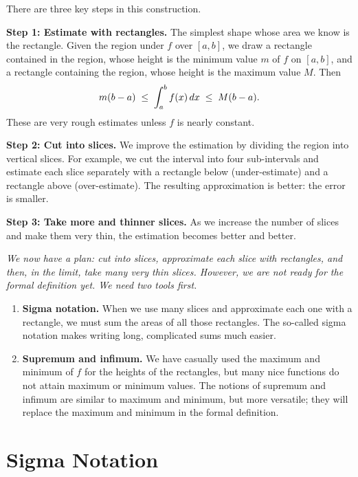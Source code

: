 There are three key steps in this construction.

\textbf{Step 1: Estimate with rectangles.}  The simplest shape whose area we know is the rectangle.  Given the region under $f$ over $[a,b]$, we draw a rectangle contained in the region, whose height is the minimum value $m$ of $f$ on $[a,b]$, and a rectangle containing the region, whose height is the maximum value $M$.  Then
\[
  m(b-a) \;\le\; \int_{a}^{b} f(x)\,dx \;\le\; M(b-a).
\]
These are very rough estimates unless $f$ is nearly constant.

\textbf{Step 2: Cut into slices.}  We improve the estimation by dividing the region into vertical slices.  For example, we cut the interval into four sub-intervals and estimate each slice separately with a rectangle below (under-estimate) and a rectangle above (over-estimate).  The resulting approximation is better: the error is smaller.

\textbf{Step 3: Take more and thinner slices.}  As we increase the number of slices and make them very thin, the estimation becomes better and better.

\textit{We now have a plan: cut into slices, approximate each slice with rectangles, and then, in the limit, take many very thin slices.  However, we are not ready for the formal definition yet.  We need two tools first.}

\begin{enumerate}
  \item \textbf{Sigma notation.}  When we use many slices and approximate each one with a rectangle, we must sum the areas of all those rectangles.  The so-called sigma notation makes writing long, complicated sums much easier.
  \item \textbf{Supremum and infimum.}  We have casually used the maximum and minimum of $f$ for the heights of the rectangles, but many nice functions do not attain maximum or minimum values.  The notions of supremum and infimum are similar to maximum and minimum, but more versatile; they will replace the maximum and minimum in the formal definition.
\end{enumerate}

\section{Sigma Notation}
\label{sec:7.2}

